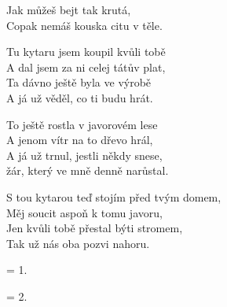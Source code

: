 
\re{}
Jak můžeš bejt tak krutá,\\
Copak nemáš kouska citu v těle.

\ve{}
Tu kytaru jsem koupil kvůli tobě\\
A dal jsem za ni celej tátův plat,\\
Ta dávno ještě byla ve výrobě\\
A já už věděl, co ti budu hrát.

\ve{}
To ještě rostla v javorovém lese\\
A jenom vítr na to dřevo hrál,\\
A já už trnul, jestli někdy snese,\\
žár, který ve mně denně narůstal.

\cho{}
S tou kytarou teď stojím před tvým domem,\\
Měj soucit aspoň k tomu javoru,\\
Jen kvůli tobě přestal býti stromem,\\
Tak už nás oba pozvi nahoru.

\ve{}
= 1.

\ve{}
= 2.

\esong{}
